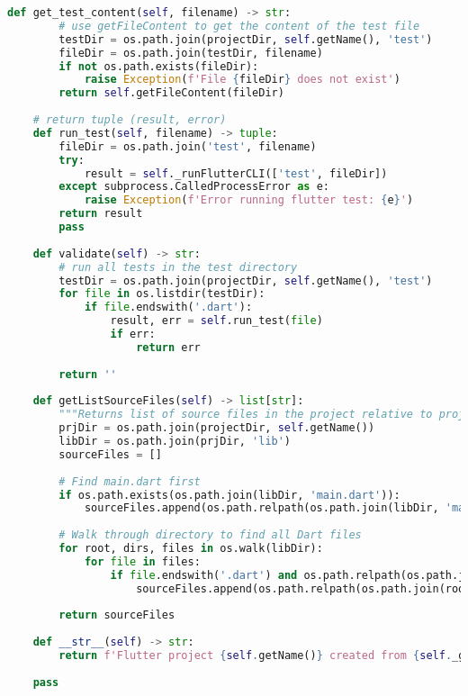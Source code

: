 \begin{lstlisting}[language=Python, caption={$\texttt{Flutter}$ class - subclass of Project.}, label={lst:2}]
    def get_test_content(self, filename) -> str:
        # use getFileContent to get the content of the test file
        testDir = os.path.join(projectDir, self.getName(), 'test')
        fileDir = os.path.join(testDir, filename)
        if not os.path.exists(fileDir):
            raise Exception(f'File {fileDir} does not exist')
        return self.getFileContent(fileDir)
    
    # return tuple (result, error)
    def run_test(self, filename) -> tuple:
        fileDir = os.path.join('test', filename)
        try:
            result = self._runFlutterCLI(['test', fileDir])
        except subprocess.CalledProcessError as e:
            raise Exception(f'Error running flutter test: {e}')
        return result
        pass
    
    def validate(self) -> str:
        # run all tests in the test directory
        testDir = os.path.join(projectDir, self.getName(), 'test')
        for file in os.listdir(testDir):
            if file.endswith('.dart'):
                result, err = self.run_test(file)
                if err:
                    return err
                
        return ''
    
    def getListSourceFiles(self) -> list[str]:
        """Returns list of source files in the project relative to project directory"""
        prjDir = os.path.join(projectDir, self.getName())
        libDir = os.path.join(prjDir, 'lib') 
        sourceFiles = []
        
        # Find main.dart first
        if os.path.exists(os.path.join(libDir, 'main.dart')):
            sourceFiles.append(os.path.relpath(os.path.join(libDir, 'main.dart'), prjDir))
        
        # Walk through directory to find all Dart files
        for root, dirs, files in os.walk(libDir):
            for file in files:
                if file.endswith('.dart') and os.path.relpath(os.path.join(root, file), prjDir) not in sourceFiles:
                    sourceFiles.append(os.path.relpath(os.path.join(root, file), prjDir))
                    
        return sourceFiles
    
    def __str__(self) -> str:
        return f'Flutter project {self.getName()} created from {self._git_url}'
    
    pass
 \end{lstlisting}

